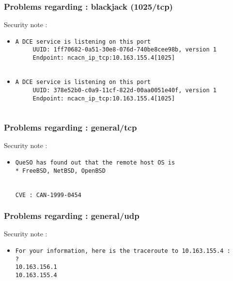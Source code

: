 \documentclass{article}
\begin{document}
\subsubsection{Problems regarding : blackjack (1025/tcp)}
Security note :\\
\begin{itemize}
\item \begin{verbatim}
A DCE service is listening on this port
     UUID: 1ff70682-0a51-30e8-076d-740be8cee98b, version 1
     Endpoint: ncacn_ip_tcp:10.163.155.4[1025]


\end{verbatim}\item \begin{verbatim}
A DCE service is listening on this port
     UUID: 378e52b0-c0a9-11cf-822d-00aa0051e40f, version 1
     Endpoint: ncacn_ip_tcp:10.163.155.4[1025]


\end{verbatim}\end{itemize}
\subsubsection{Problems regarding : general/tcp}
Security note :\\
\begin{itemize}
\item \begin{verbatim}
QueSO has found out that the remote host OS is 
* FreeBSD, NetBSD, OpenBSD  


CVE : CAN-1999-0454
\end{verbatim}\end{itemize}
\subsubsection{Problems regarding : general/udp}
Security note :\\
\begin{itemize}
\item \begin{verbatim}
For your information, here is the traceroute to 10.163.155.4 : 
?
10.163.156.1
10.163.155.4

\end{verbatim}\end{itemize}
\end{document}
